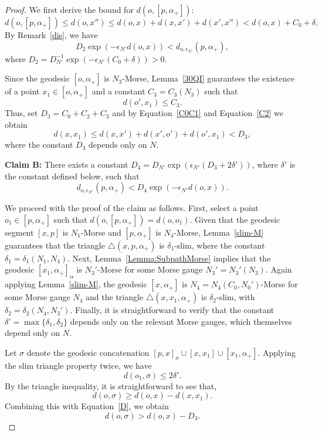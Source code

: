 \documentclass[a4paper,11pt,oneside]{article}
\begin{document}
\begin{proof}
We first derive the bound for $d(o, [p,\alpha_+])$:
\[
d(o, [p,\alpha_+])\le d(o,x'')\le d(o, x)+d(x, x')+d(x', x'')< d(o, x)+C_0+\delta.
\]
By Remark~\ref{dis}, we have
\begin{equation}\label{D_3}
    D_2\exp\left(-\epsilon_{N'}d(o, x)\right)<d_{o, \epsilon_{N'}}(p, \alpha_+),
\end{equation}
where $D_2=D_{N'}^{-1}\exp\left(-\epsilon_{N'}(C_0+\delta)\right)>0$. 

Since the geodesic $[o, \alpha_+]$ is $N_3$-Morse, Lemma~\ref{30QI} guarantees the existence of a point $x_1\in [o, \alpha_+]$ and a constant $C_3=C_3(N_3)$ such that 
\[
d(o', x_1)\le C_3.
\] 
Thus, set $D_3=C_0+C_2+C_3$ and by Equation~\eqref{C0C1} and Equation~\eqref{C2} we obtain
\begin{equation}\label{D}
    d(x, x_1)\le d(x,x' )+d(x', o')+d(o', x_1)<D_3,
\end{equation}
where the constant $D_3$ depends only on $N$.

\textbf{Claim B:}
There exists a constant $D_4 = D_{N'}\exp\left(\epsilon_{N'}(D_3+2\delta')\right)$, where $\delta'$ is the constant defined below, such that
\begin{equation}\label{D_4}
    d_{o,\epsilon_{N'}}(p, \alpha_+)< D_4\exp\left(-\epsilon_{N'}d(o, x)\right).
\end{equation}

We proceed with the proof of the claim as follows. First, select a point $o_1\in [p, \alpha_+]$ such that $d(o, [p, \alpha_+])=d(o, o_1)$.  
Given that the geodesic segment $[x, p]$ is $N_1$-Morse and $[p, \alpha_+]$ is $N_4$-Morse, Lemma~\ref{slim-M} guarantees that the triangle $\triangle(x, p, \alpha_+)$ is $\delta_1$-slim, where the constant $\delta_1 = \delta_1(N_1, N_4)$. 
 Next, Lemma~\ref{Lemma:SubpathMorse} implies that the geodesic $[x_1, \alpha_+]_{\alpha}$ is $N_3'$-Morse for some Morse gauge $N_3'=N_3'(N_3)$. Again applying Lemma~\ref{slim-M}, the geodesic $[x, \alpha_+]$ is $N_4=N_4(C_0, N_0')$-Morse for some Morse gauge $N_4$ and the triangle $\triangle(x, x_1, \alpha_+)$ is $\delta_2$-slim, with $\delta_2=\delta_2(N_4,N_3')$. Finally, it is straightforward to verify that the constant $\delta'=\max\{\delta_1,\delta_2\}$ depends only on the relevant Morse gauges, which themselves depend only on $N$.

Let $\sigma$ denote the geodesic concatenation $[p, x]_\sigma\cup[x, x_1]\cup[x_1, \alpha_+]$. Applying the slim triangle property twice, we have
\[
d(o_1, \sigma)\le 2\delta'.
\] 
By the triangle inequality, it is straightforward to see that,
\[
d(o, \sigma)\ge d(o, x)-d(x, x_1).
\]
Combining this with Equation~\eqref{D}, we obtain
\[
d(o, \sigma)> d(o, x)-D_3.
\]


\end{proof}
\end{document}
